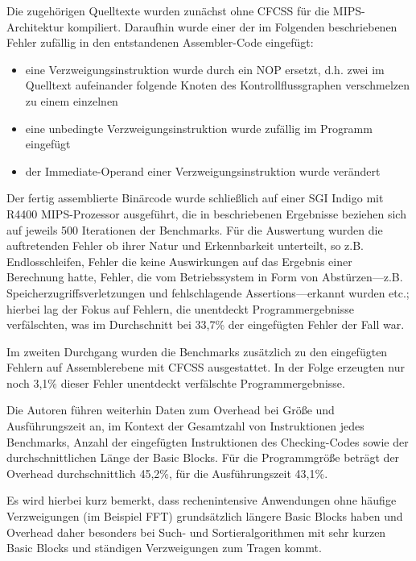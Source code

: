 \documentclass[11pt]{article}
\begin{document}
Die zugehörigen Quelltexte wurden zunächst ohne CFCSS für die MIPS-Architektur
kompiliert. Daraufhin wurde einer der im Folgenden beschriebenen Fehler
zufällig in den entstandenen Assembler-Code eingefügt:

\begin{itemize}
  \item eine Verzweigungsinstruktion wurde durch ein NOP ersetzt,
        d.h. zwei im Quelltext aufeinander folgende Knoten des Kontrollflussgraphen
        verschmelzen zu einem einzelnen
  \item eine unbedingte Verzweigungsinstruktion wurde zufällig im Programm eingefügt
  \item der Immediate-Operand einer Verzweigungsinstruktion wurde verändert
\end{itemize}

Der fertig assemblierte Binärcode wurde schließlich auf einer SGI Indigo mit
R4400 MIPS-Prozessor ausgeführt, die in \cite{oh-2002-control} beschriebenen
Ergebnisse beziehen sich auf jeweils 500 Iterationen der Benchmarks. Für die
Auswertung wurden die auftretenden Fehler ob ihrer Natur und Erkennbarkeit
unterteilt, so z.B. Endlosschleifen, Fehler die keine Auswirkungen auf das
Ergebnis einer Berechnung hatte, Fehler, die vom Betriebssystem in Form von
Abstürzen—z.B. Speicherzugriffsverletzungen und fehlschlagende
Assertions—erkannt wurden etc.; hierbei lag der Fokus auf Fehlern, die
unentdeckt Programmergebnisse verfälschten, was im Durchschnitt bei 33,7\% der
eingefügten Fehler der Fall war.

Im zweiten Durchgang wurden die Benchmarks zusätzlich zu den eingefügten
Fehlern auf Assemblerebene mit CFCSS ausgestattet. In der Folge erzeugten nur
noch 3,1\% dieser Fehler unentdeckt verfälschte Programmergebnisse.

Die Autoren führen weiterhin Daten zum Overhead bei Größe und Ausführungszeit
an, im Kontext der Gesamtzahl von Instruktionen jedes Benchmarks, Anzahl der
eingefügten Instruktionen des Checking-Codes sowie der durchschnittlichen Länge
der Basic Blocks. Für die Programmgröße beträgt der Overhead durchschnittlich
45,2\%, für die Ausführungszeit 43,1\%.

Es wird hierbei kurz bemerkt, dass rechenintensive Anwendungen ohne häufige
Verzweigungen (im Beispiel FFT) grundsätzlich längere Basic Blocks haben und
Overhead daher besonders bei Such- und Sortieralgorithmen mit sehr kurzen Basic
Blocks und ständigen Verzweigungen zum Tragen kommt.
\end{document}
